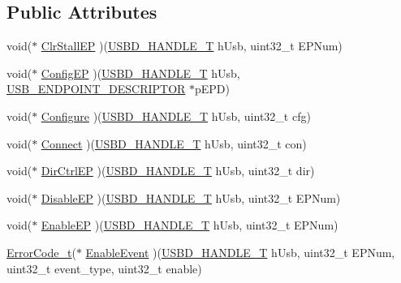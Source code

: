 \subsection*{Public Attributes}
\begin{DoxyCompactItemize}
\item 
void($\ast$ \hyperlink{structUSBD__HW__API_a72e54621b0cb3e82ac1cc1595d9a1067}{Clr\+Stall\+EP} )(\hyperlink{group__USBD__Core_gafdbb2204d929cb9d75736bd2b42342ac}{U\+S\+B\+D\+\_\+\+H\+A\+N\+D\+L\+E\+\_\+T} h\+Usb, uint32\+\_\+t E\+P\+Num)
\item 
void($\ast$ \hyperlink{structUSBD__HW__API_a1d22a234f082345d2e3b44693f52437a}{Config\+EP} )(\hyperlink{group__USBD__Core_gafdbb2204d929cb9d75736bd2b42342ac}{U\+S\+B\+D\+\_\+\+H\+A\+N\+D\+L\+E\+\_\+T} h\+Usb, \hyperlink{group__USBD__Core_ga652b2871268bd903653cbff0f3448a6e}{U\+S\+B\+\_\+\+E\+N\+D\+P\+O\+I\+N\+T\+\_\+\+D\+E\+S\+C\+R\+I\+P\+T\+OR} $\ast$p\+E\+PD)
\item 
void($\ast$ \hyperlink{structUSBD__HW__API_a25d9ab77af329aa3aa97d8cf8c69bd39}{Configure} )(\hyperlink{group__USBD__Core_gafdbb2204d929cb9d75736bd2b42342ac}{U\+S\+B\+D\+\_\+\+H\+A\+N\+D\+L\+E\+\_\+T} h\+Usb, uint32\+\_\+t cfg)
\item 
void($\ast$ \hyperlink{structUSBD__HW__API_a0aa79cfec1d36414f1cbc3268b96cb19}{Connect} )(\hyperlink{group__USBD__Core_gafdbb2204d929cb9d75736bd2b42342ac}{U\+S\+B\+D\+\_\+\+H\+A\+N\+D\+L\+E\+\_\+T} h\+Usb, uint32\+\_\+t con)
\item 
void($\ast$ \hyperlink{structUSBD__HW__API_a232054acbf6a7ee115c2079ef29eacb3}{Dir\+Ctrl\+EP} )(\hyperlink{group__USBD__Core_gafdbb2204d929cb9d75736bd2b42342ac}{U\+S\+B\+D\+\_\+\+H\+A\+N\+D\+L\+E\+\_\+T} h\+Usb, uint32\+\_\+t dir)
\item 
void($\ast$ \hyperlink{structUSBD__HW__API_a7873edd36bbc6392e0ec2768c8a5d770}{Disable\+EP} )(\hyperlink{group__USBD__Core_gafdbb2204d929cb9d75736bd2b42342ac}{U\+S\+B\+D\+\_\+\+H\+A\+N\+D\+L\+E\+\_\+T} h\+Usb, uint32\+\_\+t E\+P\+Num)
\item 
void($\ast$ \hyperlink{structUSBD__HW__API_a98007fb59ff30d019d166c907dc9ae74}{Enable\+EP} )(\hyperlink{group__USBD__Core_gafdbb2204d929cb9d75736bd2b42342ac}{U\+S\+B\+D\+\_\+\+H\+A\+N\+D\+L\+E\+\_\+T} h\+Usb, uint32\+\_\+t E\+P\+Num)
\item 
\hyperlink{error_8h_a905255056c349318139d94aa4523d516}{Error\+Code\+\_\+t}($\ast$ \hyperlink{structUSBD__HW__API_a8556c919546438e9ca184c460cd1daa9}{Enable\+Event} )(\hyperlink{group__USBD__Core_gafdbb2204d929cb9d75736bd2b42342ac}{U\+S\+B\+D\+\_\+\+H\+A\+N\+D\+L\+E\+\_\+T} h\+Usb, uint32\+\_\+t E\+P\+Num, uint32\+\_\+t event\+\_\+type, uint32\+\_\+t enable)

\end{DoxyCompactItemize}
